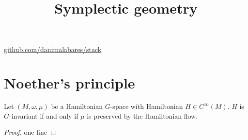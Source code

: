 



\title{Symplectic geometry}
\maketitle

\label{section-phantom}
\hfill
\href{http://github.com/danimalabares/stack}{github.com/danimalabares/stack}

\tableofcontents

\section{Noether's principle}
\label{section-Noether-principle}

\begin{theorem}
\label{theorem-Noether-principle}
Let $(M,\omega,\mu)$ be a Hamiltonian $G$-space with Hamiltonian
$H\in C^\infty(M)$. $H$ is $G$-invariant if and only if $\mu$ is preserved by
the Hamiltonian flow.
\end{theorem}

\begin{proof}
one line
\end{proof}






